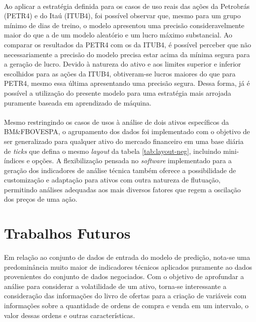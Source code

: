 \documentclass[grad,numbers]{coppe}
\begin{document}
        \paragraph{}Ao aplicar a estratégia definida para os casos de uso reais das ações da Petrobrás (PETR4) e do Itaú (ITUB4), foi possível observar que, mesmo para um grupo mínimo de dias de treino, o modelo apresentou uma precisão consideravelmente maior do que a de um modelo aleatório e um lucro máximo substancial. Ao comparar os resultados da PETR4 com os da ITUB4, é possível perceber que não necessariamente a precisão do modelo precisa estar acima da mínima segura para a geração de lucro. Devido à natureza do ativo e aos limites superior e inferior escolhidos para as ações da ITUB4, obtiveram-se lucros maiores do que para PETR4, mesmo essa última apresentando uma precisão segura. Dessa forma, já é possível a utilização do presente modelo para uma estratégia mais arrojada puramente baseada em aprendizado de máquina.
        
        \paragraph{}Mesmo restringindo os casos de usos à análise de dois ativos específicos da BM\&FBOVESPA, o agrupamento dos dados foi implementado com o objetivo de ser generalizado para qualquer ativo do mercado financeiro em uma base diária de \textit{ticks} que defina o mesmo \textit{layout} da tabela \ref{tab:layout-neg}, incluindo mini-índices e opções. A flexibilização pensada no \textit{software} implementado para a geração dos indicadores de análise técnica também oferece a possibilidade de customização e adaptação para ativos com outra natureza de flutuação, permitindo análises adequadas aos mais diversos fatores que regem a oscilação dos preços de uma ação.
        
    \section{Trabalhos Futuros}
        
        \paragraph{}Em relação ao conjunto de dados de entrada do modelo de predição, nota-se uma predominância muito maior de indicadores técnicos aplicados puramente ao dados provenientes do conjunto de dados negociados. Com o objetivo de aprofundar a análise para considerar a volatilidade de um ativo, torna-se interessante a consideração das informações do livro de ofertas para a criação de variáveis com informações sobre a quantidade de ordens de compra e venda em um intervalo, o valor dessas ordens e outras características.
        
\end{document}
